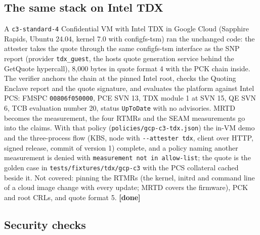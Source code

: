 \documentclass[letterpaper,twocolumn,10pt]{article}
\begin{document}
\subsection{The same stack on Intel TDX}\label{the-same-stack-on-intel-tdx}

A \texttt{c3-standard-4} Confidential VM with Intel TDX in Google Cloud (Sapphire Rapids, Ubuntu 24.04, kernel 7.0 with configfs-tsm) ran the unchanged code: the attester takes the quote through the same configfs-tsm interface as the SNP report (provider \texttt{tdx\_guest}, the host\textquotesingle s quote generation service behind the GetQuote hypercall), 8,000 bytes in quote format 4 \cite{intel2025tdxdcap} with the PCK chain inside. The verifier anchors the chain at the pinned Intel root, checks the Quoting Enclave report and the quote signature, and evaluates the platform against Intel PCS: FMSPC \texttt{00806f050000}, PCE SVN 13, TDX module 1 at SVN 15, QE SVN 6, TCB evaluation number 20, status \texttt{UpToDate} with no advisories. MRTD becomes the measurement, the four RTMRs and the SEAM measurements go into the claims. With that policy (\texttt{policies/gcp-c3-tdx.json}) the in-VM demo and the three-process flow (KBS, node with \texttt{-\/-attester\ tdx}, client over HTTP, signed release, commit of version 1) complete, and a policy naming another measurement is denied with \texttt{measurement\ not\ in\ allow-list}; the quote is the golden case in \texttt{tests/fixtures/tdx/gcp-c3} with the PCS collateral cached beside it. Not covered: pinning the RTMRs (the kernel, initrd and command line of a cloud image change with every update; MRTD covers the firmware), PCK and root CRLs, and quote format 5. \textbf{{[}done{]}}

\subsection{Security checks}\label{security-checks}
\end{document}
